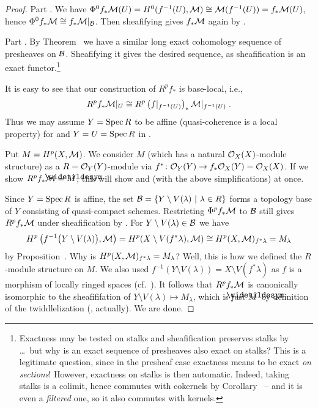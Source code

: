 \documentclass[a4paper,parskip=half,numbers=enddot, DIV=12]{scrreprt}
\begin{document}
 \begin{proof}
 	Part . We have $\Phi^0f_*\mathcal{M}(U)=H^0(f^{-1}(U),\mathcal{M})\cong \mathcal{M}(f^{-1}(U))=f_*\mathcal{M}(U)$, hence $\Phi^0f_*\mathcal{M}\cong f_*\mathcal{M}|_{\mathcal{B}}$. Then sheafifying gives $f_*\mathcal{M}$ again by \cite[Proposition~1.2.1,]{alggeo1}.
 	
 	Part . By Theorem~ we have a similar long exact cohomology sequence of presheaves on $\mathcal{B}$. Sheafifying it gives the desired sequence, as sheafification  is an exact functor.\footnote{Exactness may be tested on stalks and sheafification preserves stalks by \cite[Proposition1.2.1]{alggeo1} \ldots\ but why is an exact sequence of presheaves also exact on stalks? This is a legitimate question, since in the presheaf case exactness means to be exact \emph{on sections}! However, exactness on stalks is then automatic. Indeed, taking stalks is a colimit, hence commutes with cokernels by Corollary~ -- and it is even a \emph{filtered} one, so it also commutes with kernels.}
 	
 	It is easy to see that our construction of $R^pf_*$ is base-local, i.e.,
 	\begin{align*}
 		R^pf_*\mathcal{M}|_U\cong R^p\left(f|_{f^{-1}(U)}\right)_*\mathcal{M}|_{f^{-1}(U)}\;.
 	\end{align*}
 	Thus we may assume $Y=\operatorname{Spec} R$ to be affine (quasi-coherence is a local property) for  and $Y=U=\operatorname{Spec} R$ in . 
 	
 	Put $M=H^p(X,\mathcal{M})$. We consider $M$ (which has a natural $\mathcal{O}_X(X)$-module structure) as a $R=\mathcal{O}_Y(Y)$-module via $f^*\colon \Oo_Y(Y)\morphism f_*\Oo_X(Y)=\Oo_X(X)$.  If we show $R^pf_*\Mm=\snake{M}$, this will show  and  (with the above simplifications) at once.
 	
 	Since $Y=\operatorname{Spec} R$ is affine, the set $\mathcal{B}=\left\{Y\setminus V(\lambda)\ \middle|\  \lambda\in R\right\}$ forms a topology base of $Y$ consisting of quasi-compact schemes. Restricting $\Phi^pf_*\mathcal{M}$ to $\mathcal{B}$ still gives $R^pf_*\mathcal{M}$ under sheafification by \cite[Proposition~1.2.1]{alggeo1}. For $Y\setminus V(\lambda)\in\mathcal{B}$ we have
 	\begin{align*}
 	H^p\left(f^{-1}\big(Y\setminus V(\lambda)\big),\mathcal{M}\right)= H^p(X\setminus V(f^*\lambda),\mathcal{M})\cong H^p(X,\mathcal{M})_{f^*\lambda} =M_\lambda
 	\end{align*}
 	by Proposition~. Why is $H^p(X,\mathcal{M})_{f^*\lambda} =M_\lambda$? Well, this is how we defined the $R$-module structure on $M$.  We also used $f^{-1}(Y\setminus V(\lambda))=X\setminus V(f^*\lambda)$ as $f$ is a morphism of locally ringed spaces (cf.\ \cite[Definition~1.3.4]{alggeo1}). It follows that $R^pf_*\mathcal{M}$ is canonically isomorphic to the sheafififation of $Y\setminus V(\lambda)\mapsto M_\lambda$, which is just $\snake{M}$ by definition of the twiddlelization (\cite[Definition~1.5.1]{alggeo1}, actually). We are done.
 \end{proof}
\end{document}
